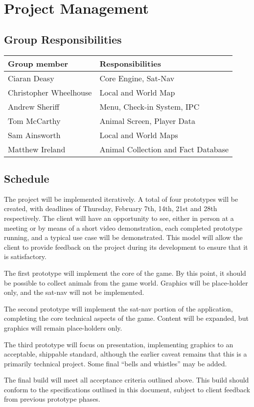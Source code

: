 \documentclass[12pt,a4paper,twoside]{article}
\begin{document}
\section{Project Management}

\subsection{Group Responsibilities}

\begin{tabular}{|l|l|}
\hline
\textbf{Group member} & \textbf{Responsibilities}\\
\hline
Ciaran Deasy & Core Engine, Sat-Nav\\
\hline
Christopher Wheelhouse & Local and World Map\\
\hline
Andrew Sheriff & Menu, Check-in System, IPC\\
\hline
Tom McCarthy & Animal Screen, Player Data\\
\hline
Sam Ainsworth & Local and World Maps\\
\hline
Matthew Ireland & Animal Collection and Fact Database\\
\hline
\end{tabular}

\subsection{Schedule}
The project will be implemented iteratively.
A total of four prototypes will be created, with deadlines of Thursday, February 7th, 14th, 21st and 28th respectively.
The client will have an opportunity to see, either in person at a meeting or by means of a short video demonstration, each completed prototype running, and a typical use case will be demonstrated.
This model will allow the client to provide feedback on the project during its development to ensure that it is satisfactory.

The first prototype will implement the core of the game. By this point, it should be possible to collect animals from the game world. Graphics will be place-holder only, and the sat-nav will not be implemented.

The second prototype will implement the sat-nav portion of the application, completing the core technical aspects of the game. Content will be expanded, but graphics will remain place-holders only.

The third prototype will focus on presentation, implementing graphics to an acceptable, shippable standard, although the earlier caveat remains that this is a primarily technical project. Some final ``bells and whistles'' may be added.

The final build will meet all acceptance criteria outlined above. This build should conform to the specifications outlined in this document, subject to client feedback from previous prototype phases.
\end{document}
